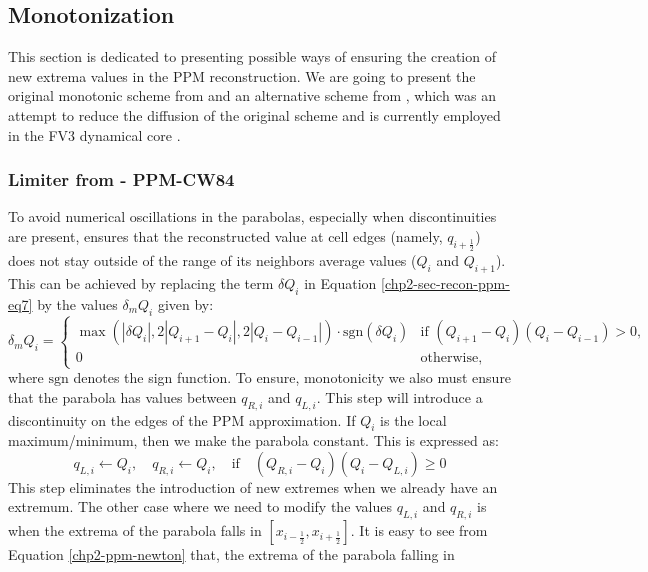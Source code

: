\subsection{Monotonization}
\label{chp2-sec-mono}
This section is dedicated to presenting possible ways of ensuring the creation of new 
extrema values in the PPM reconstruction. We are going to present the original 
monotonic scheme from \citet{colella:1984} and an alternative scheme from \citet{lin:2004},
which was an attempt to reduce the diffusion of the original scheme \citet{colella:1984}
and is currently employed in the FV3 dynamical core \citep{harris:2021}.
\subsubsection{Limiter from \citet{colella:1984} - PPM-CW84}
To avoid numerical oscillations in the parabolas, especially when discontinuities are present,
\citet{colella:1984} ensures that the reconstructed value 
at cell edges (namely, $q_{i+\frac{1}{2}}$) does not stay outside of the range of its 
neighbors average values ($Q_{i}$ and $Q_{i+1}$).
This can be achieved by replacing the term $\delta Q_i$ in Equation \eqref{chp2-sec-recon-ppm-eq7}
by the values $\delta_m Q_i$ given by:
\begin{equation}
	\label{chp2-sec-mono-eq1}
	\delta_m Q_{i} =
	\begin{cases}
		\max(|\delta Q_i|,2|Q_{i+1}-Q_{i}|, 2|Q_{i}-Q_{i-1}|) \cdot \text{sgn}(\delta Q_i)& 
		\text{if } (Q_{i+1}-Q_{i})(Q_{i}-Q_{i-1}) > 0,\\
		0 & \text{otherwise,} 
	\end{cases}
\end{equation}
where $\text{sgn}$ denotes the sign function.
To ensure, monotonicity we also must ensure that the parabola has values between
$q_{R,i}$ and $q_{L,i}$.
This step will introduce a discontinuity on the edges of the PPM approximation.
If $Q_i$ is the local maximum/minimum, then we make the parabola constant. 
This is expressed as:
	\begin{equation}
		\label{chp2-sec-mono-eq2}
		q_{L,i} \leftarrow Q_i, \quad q_{R,i} \leftarrow Q_i, \quad \text{if} \quad (Q_{R,i}-Q_i)(Q_i-Q_{L,i}) \geq 0
	\end{equation}
	This step eliminates the introduction of new extremes when we already have an extremum.
The other case where we need to modify the values $q_{L,i}$ and $q_{R,i}$
is when the extrema of the parabola falls in $[x_{i-\frac{1}{2}},x_{i+\frac{1}{2}}]$.
It is easy to see from Equation \eqref{chp2-ppm-newton} that, the extrema of the parabola falling in 
